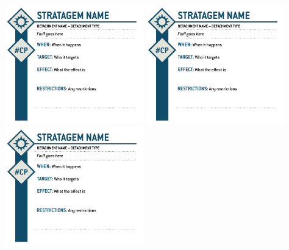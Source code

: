 \documentclass{report}
\begin{document}
\begin{multicols}{2}
\begin{minipage}[t][23.5cm][b]{\textwidth}
\includegraphics[width =0.45\textwidth]{Images/Stratagems/Stratagem_4.png}
\includegraphics[width =0.45\textwidth]{Images/Stratagems/Stratagem_5.png}
\includegraphics[width =0.45\textwidth]{Images/Stratagems/Stratagem_6.png}
\end{minipage}
\end{multicols}
\end{document}
